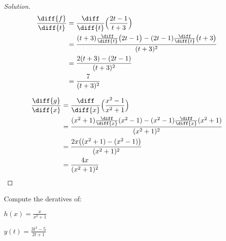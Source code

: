 \documentclass[crop=false,class=book,oneside]{standalone}
\begin{document}
            \begin{proof}[Solution]
                \par\hfill\par
                \begin{minipage}[b]{.49\textwidth}
                    \centering
                    \begin{align*}
                        \frac{\diff{f}}{\diff{t}}
                        &=\frac{\diff}{\diff{t}}
                            \Big(\frac{2t-1}{t+3}\Big)\\
                        &=\frac{(t+3)\frac{\diff}{\diff{t}}
                                \big(2t-1\big)-
                                (2t-1)\frac{\diff}{\diff{t}}
                                \big(t+3\big)}
                               {(t+3)^{2}}\\
                        &=\frac{2(t+3)-(2t-1)}{(t+3)^{2}}\\
                        &=\frac{7}{(t+3)^{2}}
                    \end{align*}
                \end{minipage}
                \hfill
                \vline
                \begin{minipage}[b]{.49\textwidth}
                    \centering
                    \begin{align*}
                        \frac{\diff{g}}{\diff{x}}
                        &=\frac{\diff}{\diff{x}}
                            \Big(\frac{x^{2}-1}{x^{2}+1}\Big)\\
                        &=\frac{(x^{2}+1)\frac{\diff}{\diff{x}}
                                (x^{2}-1)-(x^{2}-1)
                                \frac{\diff}{\diff{x}}(x^{2}+1)}
                               {(x^{2}+1)^{2}}\\
                        &=\frac{2x\big((x^{2}+1)-(x^{2}-1)\big)}
                               {(x^{2}+1)^{2}}\\
                        &=\frac{4x}{(x^{2}+1)^{2}}
                    \end{align*}
                \end{minipage}
            \end{proof}
            \begin{problem}
                Compute the deratives of:
                \begin{enumerate}[label=(\alph*)]
                    \begin{multicols}{2}
                        \item $h(x)=\frac{x}{x^{2}+1}$
                        \item $y(t)=\frac{3t^{2}-5}{2t+1}$
                    \end{multicols}
                \end{enumerate}
            \end{problem}
\end{document}
